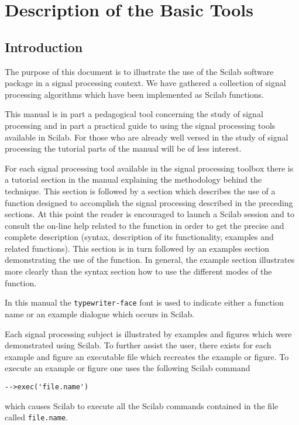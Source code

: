 \chapter{Description of the Basic Tools}

\section{Introduction}

The purpose of this document is to illustrate the use of the Scilab software
package
in a signal processing context.
We have gathered a collection of signal processing 
algorithms which have been implemented 
as Scilab functions. 

	This manual is in part a pedagogical tool concerning
the study of signal processing and in part a practical guide
to using the signal processing tools available in Scilab. 
For those who are already well versed in the study of signal processing 
the tutorial parts of the manual will be of less interest. 

	For each signal processing tool available in the signal 
processing toolbox there is a tutorial section in the manual explaining the
methodology behind the technique. This  section is followed by a 
section which describes the use  of a function designed to 
accomplish the signal processing described in the preceding sections.  
At this point the reader is encouraged to launch a Scilab session and to
consult the on-line help related to the function in order to get the precise 
and complete description (syntax, description of its functionality, examples 
and related functions). This
section is in turn followed by an examples section demonstrating the
use of the function.  In general, the example section illustrates
more clearly than the syntax section how to use the different modes
of the function.

	In this manual the {\tt typewriter-face} font is used to indicate
either a function name or an example dialogue which occurs in Scilab.

	Each signal processing subject is illustrated by examples
and figures which were demonstrated using Scilab.
To further assist the user, there exists for each example and figure an 
executable file which recreates the example or figure.  
To execute an example or figure one uses the following Scilab command
\begin{verbatim}
-->exec('file.name')
\end{verbatim}
which causes Scilab to execute all the Scilab commands contained
in the file called {\tt file.name}.  

